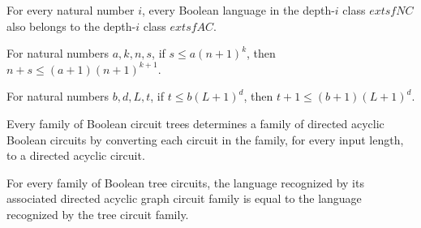 \begin{theorem}
\label{BoolCircuit.NCLevel_subset_ACLevel}
\leanok
{}
For every natural number $i$, every Boolean language in the depth-$i$ class $	extsf{NC}$
also belongs to the depth-$i$ class $	extsf{AC}$.
\end{theorem}

\begin{theorem}
\label{BoolCircuit.poly_add_input}
\leanok
{}
For natural numbers $a,k,n,s$, if $s \le a(n+1)^k$, then $n+s \le (a+1)(n+1)^{k+1}$.
\end{theorem}

\begin{theorem}
\label{BoolCircuit.polylog_add_one}
\leanok
{}
For natural numbers $b,d,L,t$, if $t \le b(L+1)^d$, then $t+1 \le (b+1)(L+1)^d$.
\end{theorem}

\begin{definition}
\label{BoolCircuit.TreeCircuitFamily.toDAG}
\leanok
{}
Every family of Boolean circuit trees determines a family of directed acyclic Boolean
circuits by converting each circuit in the family, for every input length, to a directed
acyclic circuit.
\end{definition}

\begin{theorem}
\label{BoolCircuit.TreeCircuitFamily.language_toDAG}
\leanok
{}
For every family of Boolean tree circuits, the language recognized by its associated
directed acyclic graph circuit family is equal to the language recognized by the tree
circuit family.
\end{theorem}

